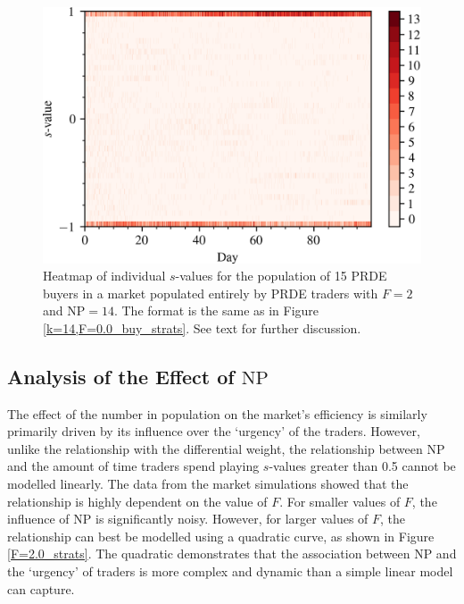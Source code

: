 \documentclass[a4paper,twoside]{article}
\begin{document}
\begin{figure}[htbp]
    \centerline{\includegraphics[width=\columnwidth]{k=14,F=2.0_buy_strats.png}}
    \caption{
        Heatmap of individual $s$-values for the population of 15 PRDE buyers in a market populated entirely by PRDE traders with $F=2$ and $\mathrm{NP}=14$.
        The format is the same as in Figure \ref{k=14,F=0.0_buy_strats}.
        See text for further discussion.
    }
    \label{k=14,F=2.0_buy_strats}
\end{figure}

\subsection{Analysis of the Effect of $\mathrm{NP}$}

The effect of the number in population on the market's efficiency is similarly primarily driven by its influence over the `urgency' of the traders.
However, unlike the relationship with the differential weight, the relationship between $\mathrm{NP}$ and the amount of time traders spend playing $s$-values greater than 0.5 cannot be modelled linearly.
The data from the market simulations showed that the relationship is highly dependent on the value of $F$.
For smaller values of $F$, the influence of $\mathrm{NP}$ is significantly noisy.
However, for larger values of $F$, the relationship can best be modelled using a quadratic curve, as shown in Figure  \ref{F=2.0_strats}.
The quadratic demonstrates that the association between $\mathrm{NP}$ and the `urgency' of traders is more complex and dynamic than a simple linear model can capture.
\end{document}
